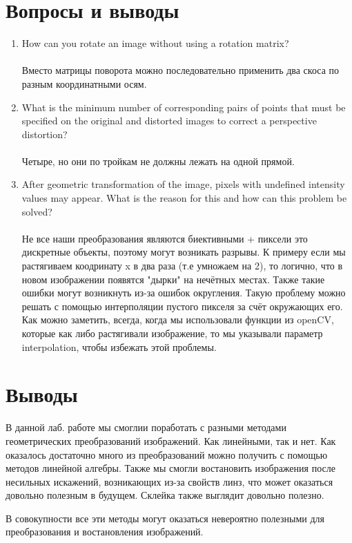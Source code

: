 \documentclass[a4paper,12pt]{article}
\begin{document}
\section{Вопросы и выводы}
\begin{enumerate}
\\
\\
\item How can you rotate an image without using a rotation matrix?
\\
\\
 Вместо матрицы поворота можно последовательно применить два скоса по разным координатными осям.
 \\
\item What is the minimum number of corresponding pairs of points that must be specified on the original and distorted images to correct a perspective distortion?
\\
\\
 Четыре, но они по тройкам не должны лежать на одной прямой.
\\
\item After geometric transformation of the image, pixels with undefined intensity values may appear. What is the reason for this and how can this problem be solved?
\\
\\
Не все наши преобразования являются биективными + пиксели это дискретные объекты, поэтому могут возникать разрывы. К примеру если мы растягиваем коодринату x в два раза (т.е умножаем на 2), то логично, что в новом изображении появятся "дырки" на нечётных местах. Также такие ошибки могут возникнуть из-за ошибок округления. 
 Такую проблему можно решать с помощью интерполяции пустого пикселя за счёт окружающих его. Как можно заметить, всегда, когда мы использовали функции из openCV, которые как либо растягивали изображение, то мы указывали параметр interpolation, чтобы избежать этой проблемы.
\end{enumerate}

\section{Выводы}
В данной лаб. работе мы смоглии поработать с разными методами геометрических преобразований изображений. Как линейными, так и нет. Как оказалось достаточно много из преобразований можно получить с помощью методов линейной алгебры. 
Также мы смогли востановить изображения после несильных искажений, возникающих из-за свойств линз, что может оказаться довольно полезным в будущем. Склейка также выглядит довольно полезно.

В совокупности все эти методы могут оказаться невероятно полезными для преобразования и востановления изображений.
\end{document}
